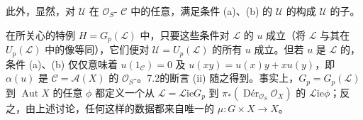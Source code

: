 此外，显然，对 $\mathcal U$ 在 $\mathcal O_S$- $\mathcal C$ 中的任意，满足条件 (a)、(b) 的 $\mathcal U$ 的构成 $\mathcal U$ 的子。

在所关心的特例 $H=G_p(\mathcal L)$ 中，只要这些条件对 $\mathcal L$ 的 $u$ 成立（将 $\mathcal L$ 与其在 $U_p(\mathcal L)$ 中的像等同），它们便对 $\mathcal U=U_p(\mathcal L)$ 的所有 $u$ 成立。但若 $u$ 是 $\mathcal L$ 的，条件 (a)、(b) 仅仅意味着 $u(1_{\mathcal C})=0$ 及 $u(xy)=u(x)y+xu(y)$，即 $\alpha(u)$ 是 $\mathcal C=\mathcal A(X)$ 的 $\mathcal O_S$-。7.2的断言 (ii) 随之得到。事实上，$G_p=G_p(\mathcal L)$ 到 $\operatorname{Aut}X$ 的任意 $\phi$ 都定义一个从 $\mathcal L=\mathscr{L}\mathrm{ie}G_p$ 到 $\pi_*(\operatorname{D\text{é}r}_{\mathcal O_S}\mathcal O_X)$ 的 $\mathscr{L}\mathrm{ie}\phi$；反之，由上述讨论，任何这样的数据都来自唯一的 $\mu:G\times X\to X$。

